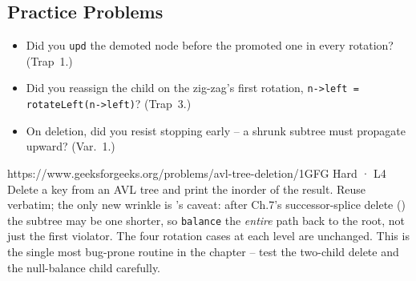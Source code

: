 \subsection{Practice Problems}

\begin{stuckbox}
\begin{itemize}[nosep, leftmargin=1.4em]
  \item Did you \texttt{upd} the demoted node before the promoted one in every rotation? (Trap~1.)
  \item Did you reassign the child on the zig-zag's first rotation, \texttt{n->left = rotateLeft(n->left)}?
        (Trap~3.)
  \item On deletion, did you resist stopping early -- a shrunk subtree must propagate upward? (Var.~1.)
\end{itemize}
\end{stuckbox}

\begin{practiceset}
    {https://www.geeksforgeeks.org/problems/avl-tree-deletion/1}{GFG Hard · L4}
    {Delete a key from an AVL tree and print the inorder of the result. Reuse 
    verbatim; the only new wrinkle is 's caveat: after Ch.7's successor-splice delete
    () the subtree may be one shorter, so \texttt{balance} the \emph{entire} path back
    to the root, not just the first violator. The four rotation cases at each level are unchanged. This is
    the single most bug-prone routine in the chapter -- test the two-child delete and the null-balance
    child carefully.}
\end{practiceset}

